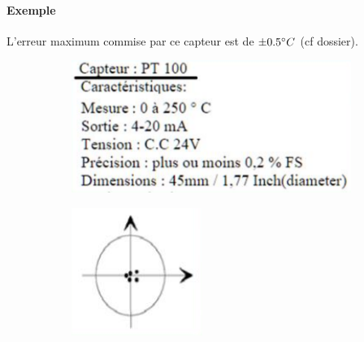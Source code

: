 \documentclass{article}
\begin{document}
            \paragraph{Exemple}
            L'erreur maximum commise par ce capteur est de $\pm 0.5\degree C$ (cf dossier).
            \begin{figure}[H]
                \centering
                \begin{subfigure}[b]{0.35\linewidth}
                    \includegraphics[width=\linewidth]{./images/002-precision-pt-100.png}
                \end{subfigure}
                \begin{subfigure}[b]{0.2\linewidth}
                    \includegraphics[width=\linewidth]{./images/003-precision-pt-100.png}
                \end{subfigure}
            \end{figure}
            
\end{document}
